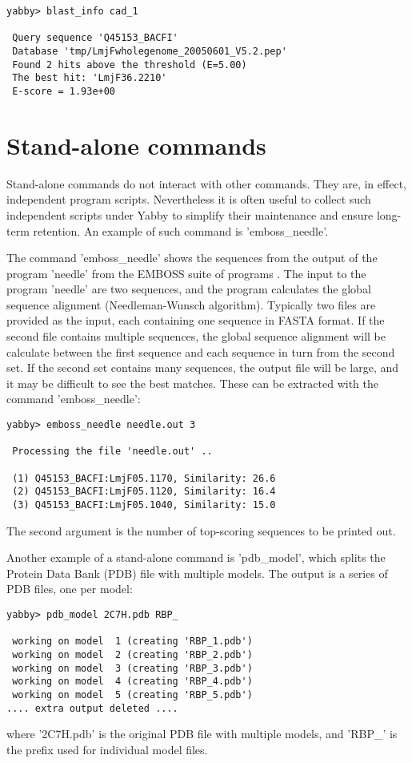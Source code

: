 \begin{verbatim}
yabby> blast_info cad_1

 Query sequence 'Q45153_BACFI'
 Database 'tmp/LmjFwholegenome_20050601_V5.2.pep'
 Found 2 hits above the threshold (E=5.00)
 The best hit: 'LmjF36.2210'
 E-score = 1.93e+00
\end{verbatim}

\section{Stand-alone commands}

Stand-alone commands do not interact with other commands. They
are, in effect, independent program scripts.  Nevertheless it is
often useful to collect such independent scripts under Yabby
to simplify their maintenance and ensure long-term retention.
An example of such command is 'emboss\_needle'.


The command 'emboss\_needle' shows the sequences from the output
of the program 'needle' from the EMBOSS suite of programs
\cite{emboss}. The input to the program 'needle' are two
sequences, and the program calculates the global sequence
alignment (Needleman-Wunsch algorithm). Typically two files
are provided as the input, each containing one sequence in FASTA  
format. If the second file contains multiple sequences,
the global sequence alignment will be calculate between
the first sequence and each sequence in turn from the
second set. If the second set contains many sequences, the
output file will be large, and it may be difficult to see
the best matches. These can be extracted with the command
'emboss\_needle':

\begin{verbatim}
yabby> emboss_needle needle.out 3

 Processing the file 'needle.out' ..

 (1) Q45153_BACFI:LmjF05.1170, Similarity: 26.6
 (2) Q45153_BACFI:LmjF05.1120, Similarity: 16.4
 (3) Q45153_BACFI:LmjF05.1040, Similarity: 15.0
\end{verbatim}

The second argument is the number of top-scoring sequences
to be printed out.


Another example of a stand-alone command is 'pdb\_model', which 
splits the Protein Data Bank (PDB) file with multiple models.
The output is a series of PDB files, one per model:

\begin{verbatim}
yabby> pdb_model 2C7H.pdb RBP_

 working on model  1 (creating 'RBP_1.pdb')
 working on model  2 (creating 'RBP_2.pdb')
 working on model  3 (creating 'RBP_3.pdb')
 working on model  4 (creating 'RBP_4.pdb')
 working on model  5 (creating 'RBP_5.pdb')
.... extra output deleted ....
\end{verbatim}

where '2C7H.pdb' is the original PDB file with multiple models,
and 'RBP\_' is the prefix used for individual model files.

